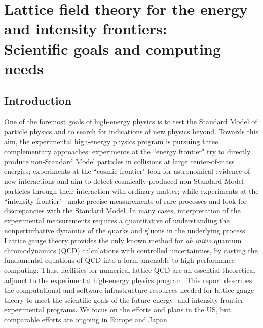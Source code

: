  
\chapter{Lattice field theory for the energy and intensity frontiers:  \\Scientific goals and computing needs}
\label{chap:LFT}

\begin{center}\begin{boldmath}



\end{boldmath}\end{center}


\section{Introduction}
\label{sec:lqcd:intro}

One of the foremost goals of high-energy physics is to test the
Standard Model of particle physics and to search for indications of
new physics beyond.  Towards this aim, the experimental high-energy
physics program is pursuing 
three complementary approaches: experiments
at the ``energy frontier" try to directly produce non-Standard Model
particles in collisions at large center-of-mass energies;
experiments at the ``cosmic frontier" look for
  astronomical evidence of new interactions and aim to detect
  cosmically-produced non-Standard-Model particles through their interaction with
  ordinary matter; while experiments at the ``intensity
frontier"~\cite{Hewett:2012ns} make precise measurements of rare
processes and look for discrepancies with
the Standard Model.   In many cases, interpretation of the experimental measurements requires a quantitative of understanding the nonperturbative dynamics of the quarks and gluons in the underlying process.  Lattice gauge theory provides the only known method
for \emph{ab initio} quantum chromodynamics (QCD) calculations with controlled uncertainties, by casting
the fundamental equations of QCD into a form amenable to high-performance
computing.  Thus, facilities for numerical lattice QCD are an
essential theoretical adjunct to the experimental high-energy physics
program.  This report describes the computational and software infrastructure resources needed for lattice gauge theory to meet the scientific goals of the future energy- and intensity-frontier experimental programs.  We focus on the efforts and plans in the US, but comparable efforts are ongoing in Europe and Japan.

